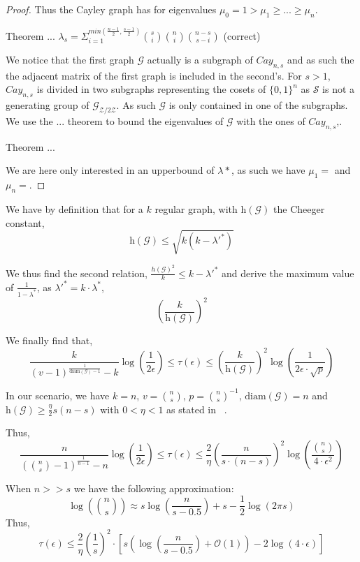 \documentclass[conference]{IEEEtran}
\begin{document}
\begin{proof}
Thus the Cayley graph has for eigenvalues $\mu_0 = 1 > \mu_1 \geq ... \geq \mu_n$.

Theorem ...
$\lambda_s = \Sigma_{i=1}^{min(\frac{n-1}{2},\frac{s-1}{2})} {s \choose i} {n \choose i}{n-s \choose s-i}$ (correct)

We notice that the first graph $\mathcal{G}$ actually is a subgraph of $Cay_{n,s}$ and as such the the adjacent matrix of the first graph is included in the second's.
For $s>1$, $Cay_{n,s}$ is divided in two subgraphs representing the cosets of $\{0,1\}^n$ as $\mathcal{S}$ is not a generating group of $\mathcal{G}_{\mathcal{Z}/2\mathcal{Z}}$. As such $\mathcal{G}$ is only contained in one of the subgraphs.
We use the ... theorem to bound the eigenvalues of $\mathcal{G}$ with the ones of  $Cay_{n,s}$,.

Theorem ...

We are here only interested in an upperbound of $\lambda*$, as such we have $\mu_1=$ and $\mu_n=$.
\end{proof}

\iffalse 
We have by definition that for a $k$ regular graph, with $\text{h} \left ( \mathcal{G} \right ) $ the Cheeger constant,
$$ \text{h} \left (\mathcal{G}\right) \leq \sqrt{k(k−{\lambda'}^*)}$$

We thus find the second relation,
$\frac{h\left (\mathcal{G}\right)^2}{k} \leq k-{\lambda'}^*$ and derive the maximum value of $\frac{1}{1-\lambda^*}$, as ${\lambda'}^* = k\cdot \lambda^*$,
$$\left ( \frac{k}{\text{h}\left (\mathcal{G}\right)} \right )^2$$

We finally find that,
$$\frac{k}{(v-1)^{\frac{1}{\text{diam}\left(\mathcal{G}\right)-1}}-k} \log\left(\frac{1}{2 \epsilon} \right)\leq \tau(\epsilon) \leq \left ( \frac{k}{\text{h}\left (\mathcal{G}\right)} \right )^2 \log \left( \frac{1}{2 \epsilon \cdot \sqrt{p}}\right) $$

In our scenario, we have $k= n$, $v={n \choose s}$, $p={n \choose s}^{-1}$, $\text{diam}\left(\mathcal{G}\right)=n$ and $\text{h}\left (\mathcal{G}\right)\geq\frac{\eta}{2}s(n-s)$ with $0<\eta<1$ as stated in ~\cite{bol88}.

Thus,
$$\frac{n}{({n \choose s}-1)^{\frac{1}{n-1}}-n} \log\left(\frac{1}{2 \epsilon} \right)\leq \tau(\epsilon) \leq \frac{2}{\eta} \left (\frac{n}{s\cdot(n-s)} \right )^2 \log \left( \frac{{n \choose s}}{4 \cdot \epsilon^2}\right) $$

When $n>>s$ we have the following approximation:
$$\log\left ({n \choose s} \right ) \approx s\log \left (\frac{n}{s-0.5}\right)+s-\frac{1}{2}\log \left(2 \pi s\right)$$
Thus,
$$\tau(\epsilon) \leq \frac{2}{\eta} \left (\frac{1}{s} \right )^2 \cdot \left [ s \left( \log \left (\frac{n}{s-0.5}\right) +\mathcal{O}\left(1\right) \right ) - 2\log \left( 4 \cdot \epsilon\right) \right ]$$
\end{document}
